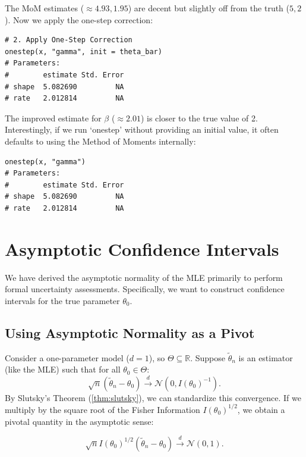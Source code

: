 \begin{ex}
The MoM estimates ($\approx 4.93, 1.95$) are decent but slightly off from the truth ($5, 2$). Now we apply the one-step correction:

\begin{verbatim}
# 2. Apply One-Step Correction
onestep(x, "gamma", init = theta_bar)
# Parameters:
#        estimate Std. Error
# shape  5.082690         NA
# rate   2.012814         NA
\end{verbatim}

The improved estimate for $\beta$ ($\approx 2.01$) is closer to the true value of 2. Interestingly, if we run `onestep' without providing an initial value, it often defaults to using the Method of Moments internally:

\begin{verbatim}
onestep(x, "gamma")
# Parameters:
#        estimate Std. Error
# shape  5.082690         NA
# rate   2.012814         NA
\end{verbatim}
\end{ex}

\section{Asymptotic Confidence Intervals}
\label{sec:Asymptotic Confidence Intervals}

We have derived the asymptotic normality of the MLE primarily to perform formal uncertainty assessments. Specifically, we want to construct confidence intervals for the true parameter $\theta_0$.

\subsection{Using Asymptotic Normality as a Pivot}
\label{sub:Using Asymptotic Normality}

Consider a one-parameter model ($d=1$), so $\Theta \subseteq \mathbb{R}$. Suppose $\tilde{\theta}_n$ is an estimator (like the MLE) such that for all $\theta_0 \in \Theta$:
\[
\sqrt{n}(\tilde{\theta}_n - \theta_0) \xrightarrow{d} \mathcal{N}(0, I(\theta_0)^{-1}).
\]
By Slutsky's Theorem (\autoref{thm:slutsky}), we can standardize this convergence. If we multiply by the square root of the Fisher Information $I(\theta_0)^{1/2}$, we obtain a pivotal quantity in the asymptotic sense:

\begin{equation}
\label{eq:asymp_pivot}
\sqrt{n} I(\theta_0)^{1/2} (\tilde{\theta}_n - \theta_0) \xrightarrow{d} \mathcal{N}(0, 1).
\end{equation}

